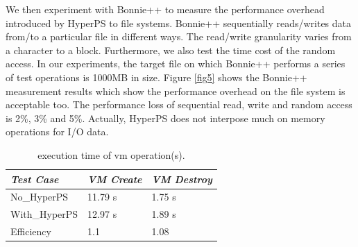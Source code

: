 
We then experiment with Bonnie++ to measure the performance overhead introduced by HyperPS to file systems. 
Bonnie++ sequentially reads/writes data from/to a particular file in different ways. The read/write granularity varies from a character to a block. Furthermore, we also test the time cost of the random access. 
In our experiments, the target file on which Bonnie++ performs a series of test operations is 1000MB in size. 
Figure \ref{fig5} shows the Bonnie++ measurement results which show the performance overhead on the file system is acceptable too. 
The performance loss of sequential read, write and random access is 2\%, 3\% and 5\%. 
Actually, HyperPS does not interpose much on memory operations for I/O data. 

\begin{table}
\centering
\caption{execution time of vm operation(s).}\label{tabvm}
\begin{tabular}{p{2cm}|p{1.8cm}|p{2cm}}
\hline
{\itshape\bfseries  Test Case} & {\itshape\bfseries VM Create} & {\itshape\bfseries VM Destroy} \\
\hline
No\_HyperPS & 11.79 s &  1.75 s\\
\hline
With\_HyperPS & 12.97 s & 1.89 s\\ 
\hline
Efficiency & 1.1 & 1.08 \\
\hline
\end{tabular}
\end{table}


